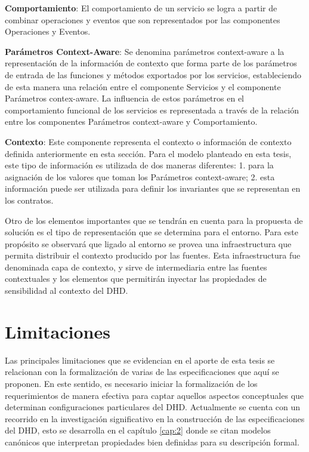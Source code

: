 \textbf{Comportamiento}: El comportamiento de un servicio se logra a partir de
combinar operaciones y eventos que son representados por las componentes
Operaciones y Eventos. 

\textbf{Parámetros Context-Aware}: Se denomina parámetros context-aware a la
representación de la información de contexto que forma parte de los
parámetros de entrada de las funciones y métodos exportados por los servicios,
estableciendo de esta manera una relación entre el componente Servicios y el
componente Parámetros contex-aware. La influencia de estos parámetros en el
comportamiento funcional de los servicios es representada a través de
la relación entre los componentes Parámetros context-aware y Comportamiento.

\textbf{Contexto}: Este componente representa el contexto o información de
contexto definida anteriormente en esta sección. Para el modelo planteado en esta tesis, este tipo
de información es utilizada de dos maneras diferentes: 1. para la
asignación de los valores que toman los Parámetros context-aware; 2. esta información puede ser utilizada para definir los invariantes que se
representan en los contratos.

Otro de los elementos importantes que se tendrán en cuenta para la
propuesta de solución es el tipo de representación que se
determina para el entorno. Para este propósito se observará que ligado al
entorno se provea una infraestructura que permita distribuir el contexto
producido por las fuentes. Esta infraestructura fue denominada capa de contexto,
y sirve de intermediaria entre las fuentes contextuales y los elementos que
permitirán  inyectar las propiedades de sensibilidad al contexto del DHD.


\section{Limitaciones}	

Las principales limitaciones que se evidencian en el aporte de esta tesis se relacionan con la formalización de varias de las especificaciones que aquí se
proponen. En este sentido, es necesario iniciar la formalización de los
requerimientos de manera efectiva para captar aquellos aspectos conceptuales
que determinan configuraciones particulares del DHD. Actualmente se cuenta con
un recorrido en la investigación significativo en la construcción de las
especificaciones del DHD, esto se desarrolla en el capítulo
\ref{cap:2} donde se citan modelos canónicos que interpretan propiedades
bien definidas para su descripción formal. 

